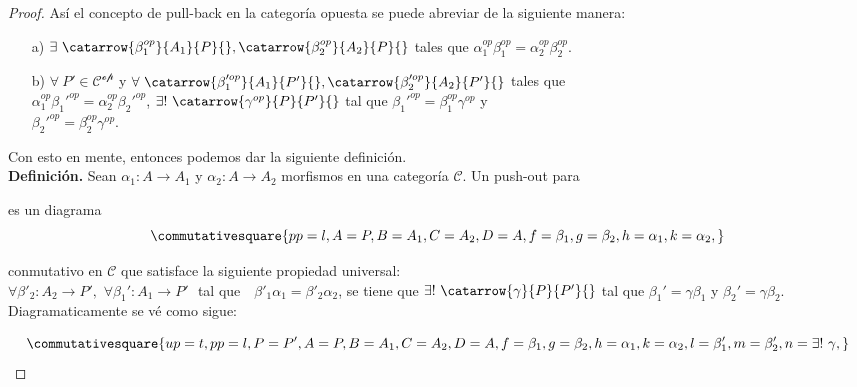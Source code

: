 \documentclass{article}
\begin{document}
\begin{enumerate}[label=\textbf{Ej \arabic*.}]
\begin{proof}
Así el concepto de pull-back en la categoría opuesta se puede abreviar de la siguiente manera:

\begin{itemize}
\item[a)] $\exists\ \catarrow{\beta_1^{op}}{A_1}{P}{},\catarrow{\beta_2^{op}}{A_2}{P}{}$ tales que
$\alpha_1^{op}\beta_1^{op}=\alpha_2^{op}\beta_2^{op}$.
\item[b)] $\forall\ P'\in\mathscr{C^{op}}$ y $\forall\ \catarrow{\beta_1'^{op}}{A_1}{P'}{},\catarrow{\beta_2'^{op}}{A_2}{P'}{}$ tales que \\
$\alpha_1^{op}\beta_1'^{op}=\alpha_2^{op}\beta_2'^{op}$, $\exists !\ \catarrow{\gamma^{op}}{P}{P'}{}$ tal que
 $\beta_1'^{op}=\beta_1^{op}\gamma^{op}$ y \\$\beta_2'^{op}=\beta_2^{op}\gamma^{op}$.
\end{itemize}

Con esto en mente, entonces podemos dar la siguiente definición.\\

\textbf{Definición.} Sean $\alpha_1\colon A\longrightarrow A_1$\,\,y\,\,$\alpha_2\colon A\longrightarrow A_2$ morfismos en una categoría 
$\mathscr{C}$. Un push-out para  es un diagrama 
 \begin{equation*}
\commutativesquare{pp=l,A=P,B=A_1,C=A_2,D=A, f=\beta_1,g=\beta_2,h=\alpha_1,k=\alpha_2,}
\end{equation*}	

 conmutativo en $\mathscr{C}$ que satisface la siguiente propiedad universal:\\

$\forall \beta'_2\colon A_2\longrightarrow P',\,\,\forall \beta_1'\colon A_1\longrightarrow P'$\,\, tal que \,\, $\beta'_1\alpha_1=\beta'_2\alpha_2$, se tiene
que $\exists !\ \catarrow{\gamma}{P}{P'}{}$ tal que $\beta_1'=\gamma\beta_1$ y $\beta_2'=\gamma\beta_2$. Diagramaticamente se 
vé como sigue:

\begin{equation*}
\commutativesquare{up=t,pp=l,P=P',A=P,B=A_1,C=A_2,D=A, f=\beta_1,g=\beta_2,h=\alpha_1,k=\alpha_2,l=\beta'_1,m=\beta'_2,n=\exists !\ \gamma,}
\end{equation*}	


\end{proof}
\end{enumerate}
\end{document}
